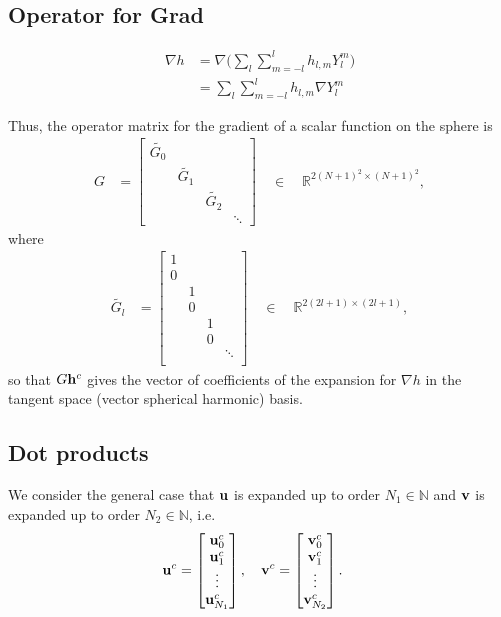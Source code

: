 \documentclass[11pt, oneside]{article}   	%
\newcommand{\R}{\mathbb{R}}
\newcommand{\N}{\mathbb{N}}
\newcommand{\Ylm}{Y^m_l}
\newcommand{\gradYlm}{\nabla Y^m_l}
\begin{document}
\subsection{Operator for Grad}
\begin{align}
\nabla h &= \nabla \Big( \sum_l \sum_{m=-l}^{l} h_{l,m} \Ylm \Big) \\
&= \sum_l \sum_{m=-l}^{l} h_{l,m} \gradYlm
\end{align}

Thus, the operator matrix for the gradient of a scalar function on the sphere is
\begin{align}
G &=  \begin{bmatrix}
		\tilde{G_0} & & & \\
		& \tilde{G_1} & & \\
		& & \tilde{G_2} & \\
		& & & \ddots
	  \end{bmatrix}  \quad \in \quad \R^{2(N+1)^2 \times (N+1)^2},
\end{align}
where
\begin{align}
\tilde{G_l} &=  \begin{bmatrix}
		1 & & & \\
		0 & & & \\
		& 1 & & \\
		& 0 & & \\
		& & 1 & \\
		& & 0 & \\
		& & & \ddots \\
	  \end{bmatrix} \quad \in \quad \R^{2(2l+1) \times (2l+1)},
\end{align}
so that \(G\bold{h}^c\) gives the vector of coefficients of the expansion for \(\nabla h\) in the tangent space (vector spherical harmonic) basis.

\subsection{Dot products}

We consider the general case that \(\bold{u}\) is expanded up to order \(N_1 \in \N\) and \(\bold{v}\) is expanded up to order \(N_2 \in \N\), i.e. 
\begin{align}
\bold{u}^c &= \begin{bmatrix}
			\bold{u}_0^c \\
			\bold{u}_1^c \\
			\vdots \\
			\bold{u}_{N_1}^c
		    \end{bmatrix},
\quad
\bold{v}^c = \begin{bmatrix}
			\bold{v}_0^c \\
			\bold{v}_1^c \\
			\vdots \\
			\bold{v}_{N_2}^c
		    \end{bmatrix}.
\end{align}
\end{document}
